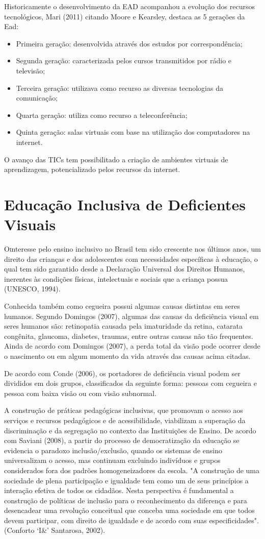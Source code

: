 Historicamente o desenvolvimento da EAD acompanhou a evolução dos recursos tecnológicos, Mari (2011) citando Moore e Kearsley, destaca as 5 gerações da Ead:
\begin{itemize}
    \item Primeira geração: desenvolvida através dos estudos por correspondência;
    \item Segunda geração: caracterizada pelos cursos transmitidos por rádio e televisão;
    \item Terceira geração: utilizava como recurso as diversas tecnologias da comunicação;
    \item Quarta geração: utiliza como recurso a teleconferência;
    \item Quinta geração: salas virtuais com base na utilização dos computadores na internet.
\end{itemize}
O avanço das TICs tem possibilitado a criação de ambientes virtuais de aprendizagem, potencializado pelos recursos da internet.

\section{Educação Inclusiva de Deficientes Visuais}
\lettrine{O} interesse pelo ensino inclusivo no Brasil tem sido crescente nos últimos anos, um direito das crianças e dos adolescentes com necessidades específicas à educação, o qual tem sido garantido desde a Declaração Universal dos Direitos Humanos, inerentes às condições físicas, intelectuais e sociais que a criança possua (UNESCO, 1994).

Conhecida também como cegueira possui algumas causas distintas em seres humanos. Segundo Domingos (2007), algumas das causas da deficiência visual em seres humanos são: retinopatia causada pela imaturidade da retina, catarata congênita, glaucoma, diabetes, traumas, entre outras causas não tão frequentes. Ainda de acordo com Domingos (2007), a perda total da visão pode ocorrer desde o nascimento ou em algum momento da vida através das causas acima citadas.

De acordo com Conde (2006), os portadores de deficiência visual podem ser divididos em dois grupos, classificados da seguinte forma: pessoas com cegueira e pessoa com baixa visão ou com visão subnormal.

A construção de práticas pedagógicas inclusivas, que promovam o acesso aos serviços e recursos pedagógicos e de acessibilidade, viabilizam a superação da discriminação e da segregação no contexto das Instituições de Ensino. De acordo com Saviani (2008), a partir do processo de democratização da educação se evidencia o paradoxo inclusão/exclusão, quando os sistemas de ensino universalizam o acesso, mas continuam excluindo indivíduos e grupos considerados fora dos padrões homogeneizadores da escola. "A construção de uma sociedade de plena participação e igualdade tem como um de seus princípios a interação efetiva de todos os cidadãos. Nesta perspectiva é fundamental a construção de políticas de inclusão para o reconhecimento da diferença e para desencadear uma revolução conceitual que conceba uma sociedade em que todos devem participar, com direito de igualdade e de acordo com suas especificidades". (Conforto `I\&'  Santarosa, 2002).

